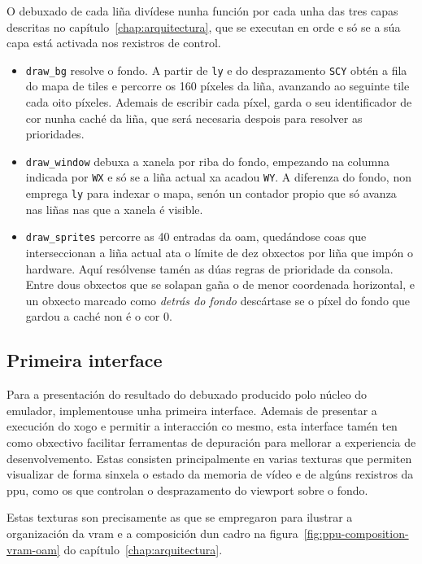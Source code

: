 O debuxado de cada liña divídese nunha función por cada unha das tres capas descritas no capítulo~\ref{chap:arquitectura},
que se executan en orde e só se a súa capa está activada nos rexistros de control.

\begin{itemize}
  \item \texttt{draw\_bg} resolve o fondo. A partir de \texttt{ly} e do desprazamento \texttt{SCY} obtén a fila do mapa de \glspl{tile}
  e percorre os 160 píxeles da liña, avanzando ao seguinte \gls{tile} cada oito píxeles.
  Ademais de escribir cada píxel, garda o seu identificador de cor nunha caché da liña, que será necesaria despois para resolver as prioridades.

  \item \texttt{draw\_window} debuxa a xanela por riba do fondo, empezando na columna indicada por \texttt{WX} e só se a liña actual xa acadou \texttt{WY}.
  A diferenza do fondo, non emprega \texttt{ly} para indexar o mapa, senón un contador propio que só avanza nas liñas nas que a xanela é visible.

  \item \texttt{draw\_sprites} percorre as 40 entradas da \acrshort{oam}, quedándose coas que interseccionan a liña actual
  ata o límite de dez obxectos por liña que impón o hardware.
  Aquí resólvense tamén as dúas regras de prioridade da consola.
  Entre dous obxectos que se solapan gaña o de menor coordenada horizontal,
  e un obxecto marcado como \textit{detrás do fondo} descártase se o píxel do fondo que gardou a caché non é o cor 0.
\end{itemize}

\subsection{Primeira interface}

Para a presentación do resultado do debuxado producido polo núcleo do emulador, implementouse unha primeira interface. Ademais de presentar a execución do xogo
e permitir a interacción co mesmo, esta interface tamén ten como obxectivo facilitar ferramentas de depuración para mellorar a experiencia de desenvolvemento.
Estas consisten principalmente en varias texturas que permiten visualizar de forma sinxela o estado da memoria de vídeo e de algúns rexistros da \acrshort{ppu},
como os que controlan o desprazamento do \gls{viewport} sobre o fondo.

Estas texturas son precisamente as que se empregaron para ilustrar a organización da \acrshort{vram} e a composición dun cadro
na figura~\ref{fig:ppu-composition-vram-oam} do capítulo~\ref{chap:arquitectura}.

